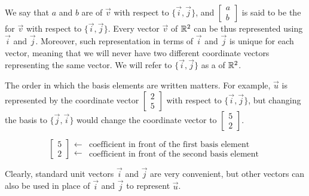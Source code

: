 \documentclass{ximera}
\begin{document}
 We say that $a$ and $b$ are  of $\vec{v}$ with respect to $\{\vec{i}, \vec{j}\}$, and $\begin{bmatrix}a\\b\end{bmatrix}$ is said to be the  for $\vec{v}$ with respect to $\{\vec{i}, \vec{j}\}$.  Every vector $\vec{v}$ of $\mathbb{R}^2$ can be thus represented using $\vec{i}$ and $\vec{j}$.  Moreover, such representation in terms of $\vec{i}$ and $\vec{j}$ is unique for each vector, meaning that we will never have two different coordinate vectors representing the same vector. We will refer to $\{\vec{i}, \vec{j}\}$ as a  of $\mathbb{R}^2$.  
 
 The order in which the basis elements are written matters.  For example, $\vec{u}$ is represented by the coordinate vector $\begin{bmatrix}2\\5\end{bmatrix}$ with respect to $\{\vec{i}, \vec{j}\}$, but changing the basis to $\{\vec{j}, \vec{i}\}$ would change the coordinate vector to $\begin{bmatrix}5\\2\end{bmatrix}$.
 
 $$\left[\begin{array}{c}  
 5\\2
 \end{array}\right]
 \begin{array}{c}
 \longleftarrow\\
 \longleftarrow
 \end{array}
\begin{array}{c}  
 \mbox{coefficient in front of the first basis element }\\\mbox{coefficient in front of the second basis element}
 \end{array}$$
 
 Clearly, standard unit vectors $\vec{i}$ and $\vec{j}$ are very convenient, but other vectors can also be used in place of $\vec{i}$ and $\vec{j}$ to represent $\vec{u}$.
 
\end{document}
